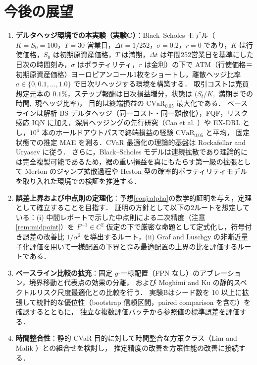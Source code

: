 \documentclass[a4paper,10pt]{jsarticle}
\theoremstyle{definition}
\newcommand{\CVaR}{\mathrm{CVaR}}
\newcommand{\Finv}{F^{-1}}
\begin{document}
\section{今後の展望}
\label{sec:future}
\begin{enumerate}
  \item \textbf{デルタヘッジ環境での本実験（実験C）}：Black--Scholes モデル（$K=S_0=100$，$T=30$ 営業日，$\Delta t=1/252$，$\sigma=0.2$，$r=0$ であり，$K$ は行使価格，$S_0$ は初期原資産価格，$T$ は満期，$\Delta t$ は年間252営業日を基準にした日次の時間刻み，$\sigma$ はボラティリティ，$r$ は金利）の下で
  ATM（行使価格＝初期原資産価格）ヨーロピアンコール1枚をショートし，離散ヘッジ比率 $a\in\{0,0.1,\dots,1.0\}$ で日次リヘッジする環境を構築する．
  取引コストは売買想定元本の $0.1\%$，ステップ報酬は日次損益増分，状態は $(S_t/K,$ 満期までの時間$,$ 現ヘッジ比率$)$，
  目的は終端損益の $\CVaR_{0.05}$ 最大化である．
  ベースラインは解析 BS デルタヘッジ（同一コスト・同一離散化），FQF，リスク感応 IQN に加え，深層ヘッジングの先行研究（Cao et al. \cite{cao2021deep,cao2023gamma}）や EX-DRL \cite{malekzadeh2024exdrl} とし，$10^4$ 本のホールドアウトパスで終端損益の経験 $\CVaR_{0.05}$ と平均，
  固定状態での推定 MAE を測る．CVaR 最適化の理論的基盤は Rockafellar and Uryasev \cite{rockafellar2000cvar} に従う．
  さらに，Black--Scholes モデルは連続拡散であり理論的には完全複製可能であるため，裾の重い損益を真にもたらす第一級の拡張として Merton のジャンプ拡散過程や Heston 型の確率的ボラティリティモデルを取り入れた環境での検証を推進する．
  \item \textbf{誤差上界および中点則の定理化}：予想\ref{conj:alpha}の数学的証明を与え，定理として確立することを目指す．
  証明の方針として以下の2ルートを想定している：(i) 中間レポートで示した中点則による二次精度（注意\ref{rem:midpoint}）を $\Finv\in C^2$ 仮定の下で厳密な命題として定式化し，符号付き誤差の改善比 $1/\alpha^2$ を導出するルート，(ii) Graf and Luschgy \cite{graf2000quantization} の非漸近量子化評価を用いて一様配置の下界と歪み最適配置の上界の比を評価するルートである．
  \item \textbf{ベースライン比較の拡充}：固定 $g$-一様配置（FPN なし）のアブレーション，境界移動と代表点の効果の分離，
  および Moghimi and Ku \cite{moghimi2025beyond} の静的スペクトルリスク尺度最適化との比較を行う．
  実験Bはシード数を 10 以上に拡張して統計的な優位性（bootstrap 信頼区間，paired comparison を含む）を確認するとともに，
  独立な複数評価バッチから参照値の標準誤差を評価する．
  \item \textbf{時間整合性}：静的 CVaR 目的に対して時間整合な方策クラス（Lim and Malik \cite{lim2022distributional}）との組合せを検討し，
  推定精度の改善を方策性能の改善に接続する．
\end{enumerate}
\end{document}
